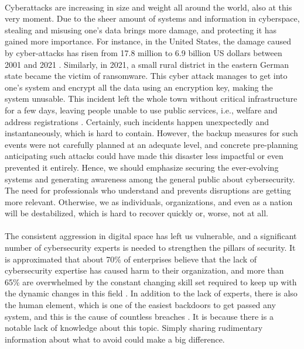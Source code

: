 \paragraph{}
Cyberattacks are increasing in size and weight all around the world, also at this very moment. Due to the sheer amount of systems and information in cyberspace, stealing and misusing one’s data brings more damage, and protecting it has gained more importance. For instance, in the United States, the damage caused by cyber-attacks has risen from 17.8 million to 6.9 billion US dollars between 2001 and 2021 \citep{Statista2022}. Similarly, in 2021, a small rural district in the eastern German state became the victim of ransomware. This cyber attack manages to get into one’s system and encrypt all the data using an encryption key, making the system unusable. This incident left the whole town without critical infrastructure for a few days, leaving people unable to use public services, i.e., welfare and address registrations \citep{DW2021}. Certainly, such incidents happen unexpectedly and instantaneously, which is hard to contain. However, the backup measures for such events were not carefully planned at an adequate level, and concrete pre-planning anticipating such attacks could have made this disaster less impactful or even prevented it entirely. Hence, we should emphasize securing the ever-evolving systems and generating awareness among the general public about cybersecurity. The need for professionals who understand and prevents disruptions are getting more relevant. Otherwise, we as individuals, organizations, and even as a nation will be destabilized, which is hard to recover quickly or, worse, not at all. 

\paragraph{}
The consistent aggression in digital space has left us vulnerable, and a significant number of cybersecurity experts is needed to strengthen the pillars of security. It is approximated that about 70\% of enterprises believe that the lack of cybersecurity expertise has caused harm to their organization, and more than 65\% are overwhelmed by the constant changing skill set required to keep up with the dynamic changes in this field \citep[section.~5]{CUT}. In addition to the lack of experts, there is also the human element, which is one of the easiest backdoors to get passed any system, and this is the cause of countless breaches \citep{McEvoy2019}. It is because there is a notable lack of knowledge about this topic. Simply sharing rudimentary information about what to avoid could make a big difference.

